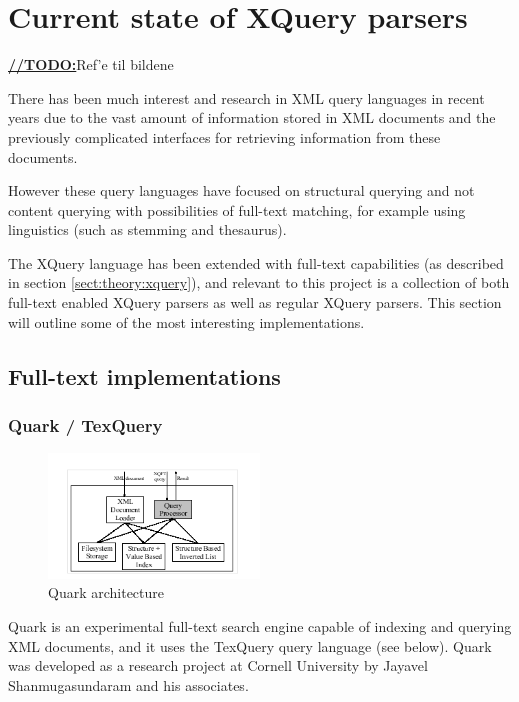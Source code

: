 \section{Current state of XQuery parsers}

\underline{\textbf{\LARGE //TODO:}}Ref'e til bildene

There has been much interest and research in XML query languages in recent
years due to the vast amount of information stored in XML documents and the
previously complicated interfaces for retrieving information from these documents.

However these query languages have focused on structural querying and not
content querying with possibilities of full-text matching, for example using
linguistics (such as stemming and thesaurus).

The XQuery language has been extended with full-text capabilities (as described
in section \ref{sect:theory:xquery}), and relevant to this project is a
collection of both full-text enabled XQuery parsers as well as regular XQuery
parsers. This section will outline some of the most interesting implementations.

\subsection{Full-text implementations}
\subsubsection{Quark / TexQuery}
\begin{figure}[!h]
  \centering
    \includegraphics[width=0.5\textwidth]{img/quark_architecture.png}
  \caption{Quark architecture}
\end{figure}

Quark is an experimental full-text search engine capable of indexing and
querying XML documents, and it uses the TexQuery query language (see below). 
Quark was developed as a research project at Cornell University by Jayavel 
Shanmugasundaram and his associates.

